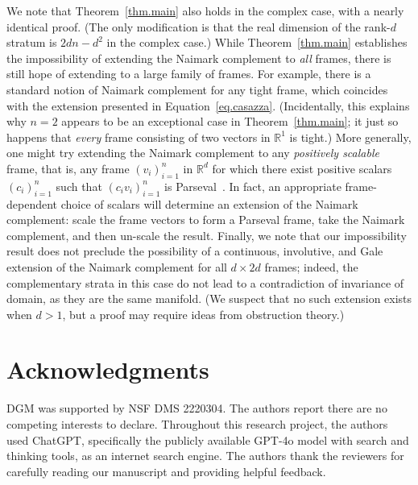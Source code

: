 \documentclass[12pt]{article}
\theoremstyle{plain}
\theoremstyle{definition}
\theoremstyle{remark}
\begin{document}
We note that Theorem~\ref{thm.main} also holds in the complex case, with a nearly identical proof.
(The only modification is that the real dimension of the rank-$d$ stratum is $2dn-d^2$ in the complex case.)
While Theorem~\ref{thm.main} establishes the impossibility of extending the Naimark complement to \textit{all} frames, there is still hope of extending to a large family of frames.
For example, there is a standard notion of Naimark complement for any tight frame, which coincides with the extension presented in Equation~\eqref{eq.casazza}.
(Incidentally, this explains why $n=2$ appears to be an exceptional case in Theorem~\ref{thm.main}; it just so happens that \textit{every} frame consisting of two vectors in $\mathbb{R}^1$ is tight.)
More generally, one might try extending the Naimark complement to any \textit{positively scalable} frame, that is, any frame $(v_i)_{i=1}^n$ in $\mathbb{R}^d$ for which there exist positive scalars $(c_i)_{i=1}^n$ such that $(c_iv_i)_{i=1}^n$ is Parseval~\cite{KutyniokOPT:13,copenhaver2014diagram,cahill2013note}.
In fact, an appropriate frame-dependent choice of scalars will determine an extension of the Naimark complement: scale the frame vectors to form a Parseval frame, take the Naimark complement, and then un-scale the result.
Finally, we note that our impossibility result does not preclude the possibility of a continuous, involutive, and Gale extension of the Naimark complement for all $d\times 2d$ frames; indeed, the complementary strata in this case do not lead to a contradiction of invariance of domain, as they are the same manifold.
(We suspect that no such extension exists when $d>1$, but a proof may require ideas from obstruction theory.)


\section*{Acknowledgments}

DGM was supported by NSF DMS 2220304. The authors report there are no competing interests to declare.
Throughout this research project, the authors used ChatGPT, specifically the publicly available GPT-4o model with search and thinking tools, as an internet search engine.
The authors thank the reviewers for carefully reading our manuscript and providing helpful feedback.
\end{document}
